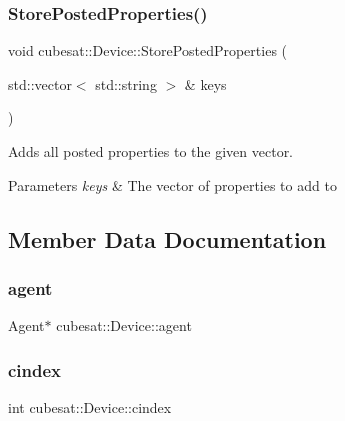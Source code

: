 \subsubsection{\texorpdfstring{Store\+Posted\+Properties()}{StorePostedProperties()}}
{\footnotesize\ttfamily void cubesat\+::\+Device\+::\+Store\+Posted\+Properties (\begin{DoxyParamCaption}\item[{std\+::vector$<$ std\+::string $>$ \&}]{keys }\end{DoxyParamCaption})\hspace{0.3cm}{\ttfamily [inline]}}



Adds all posted properties to the given vector. 


\begin{DoxyParams}{Parameters}
{\em keys} & The vector of properties to add to \\
\hline
\end{DoxyParams}


\subsection{Member Data Documentation}
\mbox{\label{classcubesat_1_1Device_a8499108eccaf7375bea8ead0182391a6}} 
\subsubsection{\texorpdfstring{agent}{agent}}
{\footnotesize\ttfamily Agent$\ast$ cubesat\+::\+Device\+::agent\hspace{0.3cm}{\ttfamily [protected]}}

\mbox{\label{classcubesat_1_1Device_a1deca725b01f8ef37e49662da6db4e53}} 
\subsubsection{\texorpdfstring{cindex}{cindex}}
{\footnotesize\ttfamily int cubesat\+::\+Device\+::cindex\hspace{0.3cm}{\ttfamily [protected]}}

\mbox{\label{classcubesat_1_1Device_a90904a89fe9cf559e50028a7d0cb878f}} 
